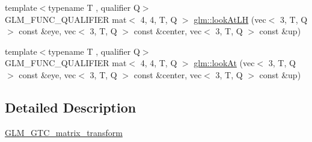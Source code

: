 \begin{DoxyCompactItemize}
\item 
{\footnotesize template$<$typename T , qualifier Q$>$ }\\G\+L\+M\+\_\+\+F\+U\+N\+C\+\_\+\+Q\+U\+A\+L\+I\+F\+I\+ER mat$<$ 4, 4, T, Q $>$ \hyperlink{group__gtc__matrix__transform_gab2c09e25b0a16d3a9d89cc85bbae41b0}{glm\+::look\+At\+LH} (vec$<$ 3, T, Q $>$ const \&eye, vec$<$ 3, T, Q $>$ const \&center, vec$<$ 3, T, Q $>$ const \&up)
\item 
{\footnotesize template$<$typename T , qualifier Q$>$ }\\G\+L\+M\+\_\+\+F\+U\+N\+C\+\_\+\+Q\+U\+A\+L\+I\+F\+I\+ER mat$<$ 4, 4, T, Q $>$ \hyperlink{group__gtc__matrix__transform_gaa64aa951a0e99136bba9008d2b59c78e}{glm\+::look\+At} (vec$<$ 3, T, Q $>$ const \&eye, vec$<$ 3, T, Q $>$ const \&center, vec$<$ 3, T, Q $>$ const \&up)
\end{DoxyCompactItemize}


\subsection{Detailed Description}
\hyperlink{group__gtc__matrix__transform}{G\+L\+M\+\_\+\+G\+T\+C\+\_\+matrix\+\_\+transform} 